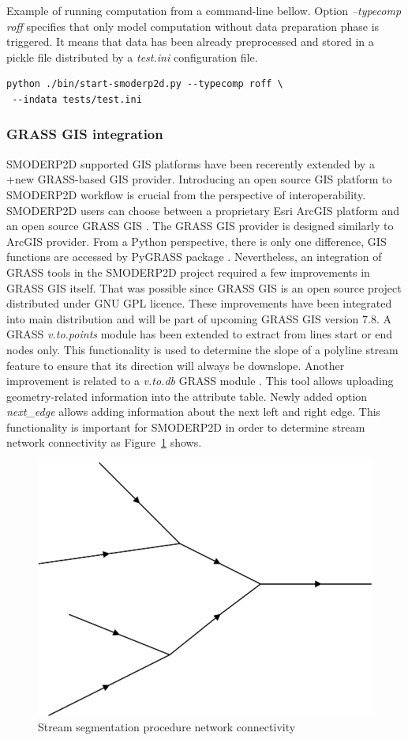Example of running computation from a command-line bellow. Option {\it
  --typecomp roff} specifies that only model computation without data
preparation phase is triggered. It means that data has been already
preprocessed and stored in a pickle file distributed by a {\it test.ini}
configuration file.

\begin{verbatim}
python ./bin/start-smoderp2d.py --typecomp roff \
 --indata tests/test.ini
\end{verbatim}

\subsubsection{GRASS GIS integration}\label{sec:grass_provider}
SMODERP2D supported GIS platforms have been recerently extended by a
+new GRASS-based GIS provider. Introducing an open source GIS platform
to SMODERP2D workflow is crucial from the perspective of
interoperability. SMODERP2D users can choose between a proprietary
Esri ArcGIS platform and an open source GRASS GIS
\cite{neteler2012grass}. The GRASS GIS provider is designed similarly
to ArcGIS provider. From a Python perspective, there is only one
difference, GIS functions are accessed by PyGRASS package
\cite{ijgi2010201}. Nevertheless, an integration of GRASS tools in the
SMODERP2D project required a few improvements in GRASS GIS
itself. That was possible since GRASS GIS is an open source project
distributed under GNU GPL licence. These improvements have been
integrated into main distribution and will be part of upcoming GRASS
GIS version 7.8. A GRASS {\em v.to.points} module
\cite{v-to-points-2019} has been extended to extract from lines start
or end nodes only. This functionality is used to determine the slope
of a polyline stream feature to ensure that its direction will always
be downslope. Another
improvement is related to a {\em v.to.db} GRASS module
\cite{v-to-db-2019}. This tool allows uploading geometry-related
information into the attribute table. Newly added option {\it
  next\_edge} allows adding information about the next left and right
edge. This functionality is important for SMODERP2D in order to
determine stream network connectivity as
Figure~\ref{fig:stream_next_edge} shows.

\begin{figure}[ht!]
  \begin{center}
    \includegraphics[width=0.6\columnwidth]{figures/stream_next_edge}
    \caption{Stream segmentation procedure network connectivity}
    \label{fig:stream_next_edge}
  \end{center}
\end{figure}


